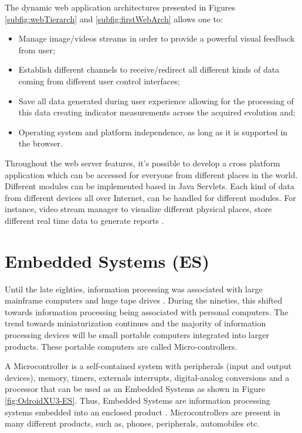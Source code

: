 The dynamic web application architectures presented in Figures \ref{subfig:webTierarch} and \ref{subfig:firstWebArch} allows one to:

\begin{itemize}
\item Manage image/videos streams in order to provide a powerful visual feedback from user;
\item Establish different channels to receive/redirect all different kinds of data coming from different user control interfaces;
\item Save all data generated during user experience allowing for the processing of this data creating indicator measurements across the acquired evolution and;
\item Operating system and platform independence, as long as it is supported in the
browser.
\end{itemize}

Throughout the web server features, it's possible to develop a cross platform application which can be accessed for everyone from different places in the world. Different modules can be implemented based in Java Servlets. Each kind of data from different devices all over Internet, can be handled for different modules. For instance, video stream manager to visualize different physical places,   store different real time data to generate reports \cite{attitalla2016, kovatsch2012, loreto2012}.


\section{Embedded Systems (ES)}
\label{sec:esystem}

Until the late eighties, information processing was associated with large mainframe computers and huge tape drives \cite{marwedel2010}. During the nineties, this shifted towards information processing being associated with personal computers. The trend towards miniaturization continues and the majority of information processing devices will be small portable computers integrated into larger products. These portable computers are called Micro-controllers.

A Microcontroller is a self-contained system with peripherals (input and output devices), memory, timers, externals interrupts, digital-analog conversions and a processor that can be used as an Embedded Systems as shown in Figure \ref{fig:OdroidXU3-ES}. Thus,  Embedded Systems  are information processing systems embedded into an enclosed product \cite{marwedel2018}. Microcontrollers are present in many different products, such as, phones, peripherals, automobiles etc. 

